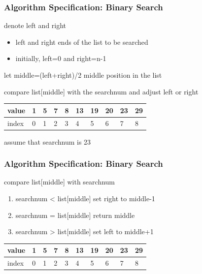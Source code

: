 \documentclass[newPxFont,sthlmFooter,nooffset]{beamer}
\begin{document}
\begin{frame}[t]
  \frametitle{Algorithm Specification: Binary Search}
denote left and right
\begin{itemize}
\item left and right ends of the list to be searched
\item initially, left=0 and right=n-1
\end{itemize}

let middle=(left+right)/2 middle position in the list

compare list[middle] with the searchnum and adjust left or right
	\begin{center}
	\begin{tabular}{| l | l | l | l | l | l | l | l | l | l |}
	\hline
	value & \cellcolor{green}1 & 5 & 7 & 8 & \cellcolor{yellow}13 & 19 & 20 & 23 & \cellcolor{red}29 \\
	\hline
	index & \cellcolor{green}0 & 1 & 2 & 3 & \cellcolor{yellow}4 & 5 & 6 & 7 & \cellcolor{red}8 \\
	\hline
	\end{tabular}
	\end{center}
\begin{center}
		\begin{small}
			 assume that searchnum is 23
		\end{small}
\end{center}

\end{frame}
\begin{frame}[t]
  \frametitle{Algorithm Specification: Binary Search}
compare list[middle] with searchnum
\begin{enumerate}
\item searchnum < list[middle] set right to middle-1
\item searchnum = list[middle] return middle 
\item searchnum > list[middle] set left to middle+1
\end{enumerate}
\begin{center}
	\begin{tabular}{| l | l | l | l | l | l | l | l | l | l |}
		\hline
		value & 1 & 5 & 7 & 8 & 13 & \cellcolor{green}19 & 20 & 23 & \cellcolor{red}29 \\
		\hline
		index & 0 & 1 & 2 & 3 & 4 & \cellcolor{green}5 & 6 & 7 & \cellcolor{red}8 \\
		\hline
	\end{tabular}
\end{center}

\end{frame}
\end{document}
